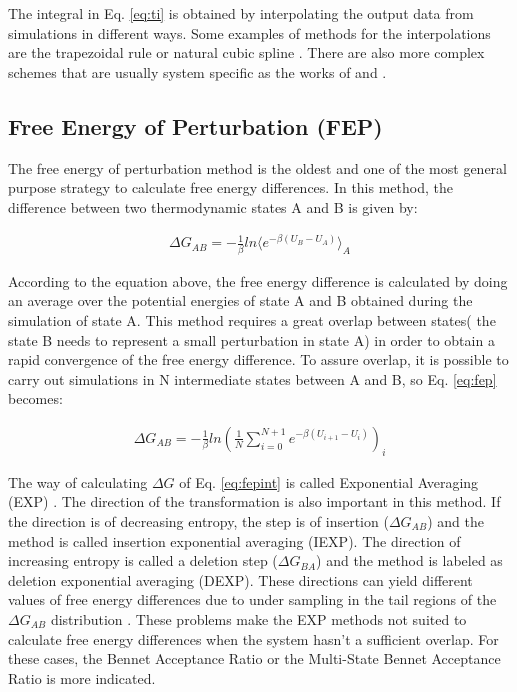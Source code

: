 The integral in Eq. \eqref{eq:ti} is obtained by interpolating the output data from simulations in different ways. Some examples of methods for the interpolations are the trapezoidal rule or natural cubic spline \cite{bareva}. There are also more complex schemes that are usually system specific as the works of  and . 

\subsection{Free Energy of Perturbation (FEP)}

The free energy of perturbation method \cite{zwanzig1954} is the oldest and one of the most general purpose strategy to calculate free energy differences. In this method, the difference between two thermodynamic states A and B is given by:

\begin{equation}
\label{eq:fep}
\begin{aligned}
\Delta G_{AB} = -\frac{1}{\beta} ln \langle{e^{-\beta (U_{B}-U_{A})}}\rangle_{A}
\end{aligned}
\end{equation}

According to the equation above, the free energy difference is calculated by doing an average over the potential energies of state A and B obtained during the simulation of state A. This method requires a great overlap between states( the state B needs to represent a small perturbation in state A) in order to obtain a rapid convergence of the free energy difference. To assure overlap, it is possible to carry out simulations in N intermediate states between A and B, so Eq. \eqref{eq:fep} becomes:

\begin{equation}
\label{eq:fepint}
\begin{aligned}
\Delta G_{AB} = -\frac{1}{\beta} ln \left(\frac{1}{N}\sum_{i=0}^{N+1}
{e^{-\beta (U_{i+1}-U_{i})}}\right)_{i}
\end{aligned}
\end{equation}

The way of calculating $\Delta G$ of Eq. \eqref{eq:fepint} is called Exponential Averaging (EXP) \cite{zwanzig1955,bareva}. The direction of the transformation is also important in this method. If the direction is of decreasing entropy, the step is of insertion ($\Delta G_{AB}$) and the method is called insertion exponential averaging (IEXP). The direction of increasing entropy is  called a deletion step ($\Delta G_{BA}$) and the method is labeled as deletion exponential averaging (DEXP). These directions can yield different values of free energy differences due to under sampling in the tail regions of the $\Delta G_{AB}$ distribution \cite{klimovich,pohorille2010}. These problems make the EXP methods not suited to calculate free energy differences when the system hasn't a sufficient overlap. For these cases, the Bennet Acceptance Ratio or the Multi-State Bennet Acceptance Ratio is more indicated.   


